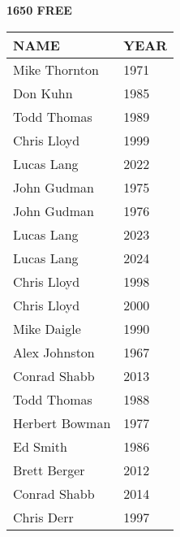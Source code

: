 \begin{minipage}[t]{0.48\textwidth}
\centering
\textbf{1650 FREE}\\[0.05cm]
\begin{tabular}{@{}p{2.8cm}p{1.2cm}@{}}
\hline
\textbf{NAME} & \textbf{YEAR} \\
\hline
Mike Thornton & 1971 \\
Don Kuhn & 1985 \\
Todd Thomas & 1989 \\
Chris Lloyd & 1999 \\
Lucas Lang & 2022 \\
John Gudman & 1975 \\
John Gudman & 1976 \\
Lucas Lang & 2023 \\
Lucas Lang & 2024 \\
Chris Lloyd & 1998 \\
Chris Lloyd & 2000 \\
Mike Daigle & 1990 \\
Alex Johnston & 1967 \\
Conrad Shabb & 2013 \\
Todd Thomas & 1988 \\
Herbert Bowman & 1977 \\
Ed Smith & 1986 \\
Brett Berger & 2012 \\
Conrad Shabb & 2014 \\
Chris Derr & 1997 \\
\hline
\end{tabular}
\end{minipage}

\vspace{0.4cm}

